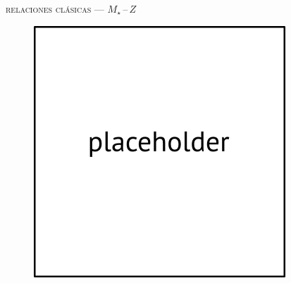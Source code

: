 \documentclass[xcolor=dvipsnames,4pt,hyperref={colorlinks,citecolor=black,linkcolor=black,urlcolor=black}]{beamer}
\begin{document}
\begin{frame}{\textsc{relaciones clásicas --- $M_\star\,$--$\,Z$}}

\begin{figure}
\includegraphics[scale=1]{img/placeholder}
\end{figure}
\end{frame}
\end{document}

